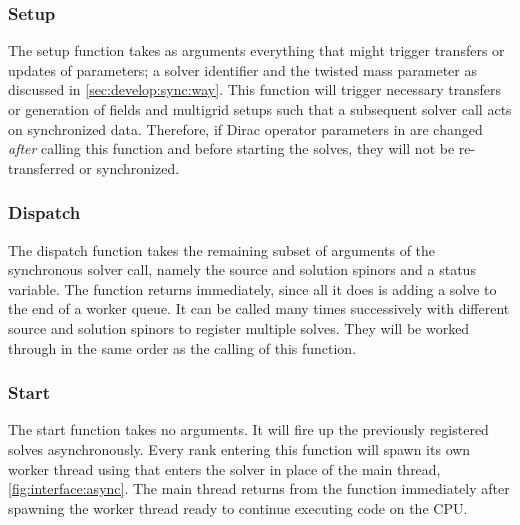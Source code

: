 \subsubsection{Setup}

The setup function  takes as arguments everything that might trigger transfers or updates of parameters; a solver identifier and the twisted mass parameter as discussed in \cref{sec:develop:sync:way}.
This function will trigger necessary transfers or generation of fields and multigrid setups such that a subsequent solver call acts on synchronized data.
Therefore, if Dirac operator parameters in \openqxd are changed \emph{after} calling this function and before starting the solves, they will not be re-transferred or synchronized.

\subsubsection{Dispatch}

The dispatch function  takes the remaining subset of arguments of the synchronous solver call, namely the source and solution spinors and a status variable.
The function returns immediately, since all it does is adding a solve to the end of a worker queue.
It can be called many times successively with different source and solution spinors to register multiple solves.
They will be worked through in the same order as the calling of this function.

\subsubsection{Start}
\label{sec:interface:solver:async:start}

The start function  takes no arguments.
It will fire up the previously registered solves asynchronously.
Every rank entering this function will spawn its own worker thread using  that enters the \quda solver in place of the main thread, \cref{fig:interface:async}.
The main thread returns from the function immediately after spawning the worker thread ready to continue executing code on the CPU.

